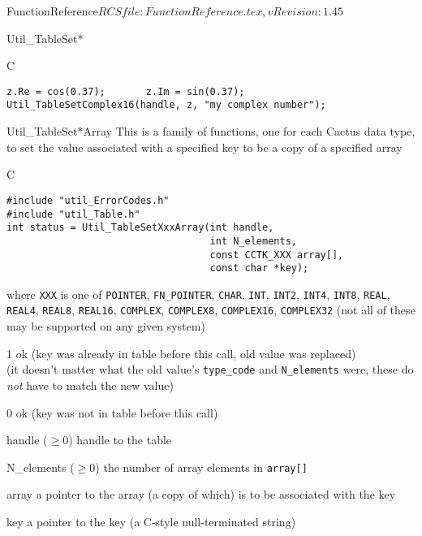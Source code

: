 \begin{cactuspart}{5}{FunctionReference}{$RCSfile: FunctionReference.tex,v $}{$Revision: 1.45 $}
\begin{FunctionDescription}{Util\_TableSet*}
\begin{Example}{C}
\begin{verbatim}
z.Re = cos(0.37);       z.Im = sin(0.37);
Util_TableSetComplex16(handle, z, "my complex number");
\end{verbatim}
\end{Example}
\end{FunctionDescription}


\begin{FunctionDescription}{Util\_TableSet*Array}
\label{Util-TableSet*Array}
This is a family of functions, one for each Cactus data type,
to set the value associated with a specified key to be a copy
of a specified array

\begin{Synopsis}{C}
\begin{verbatim}
#include "util_ErrorCodes.h"
#include "util_Table.h"
int status = Util_TableSetXxxArray(int handle,
                                   int N_elements,
                                   const CCTK_XXX array[],
                                   const char *key);
\end{verbatim}
where \verb|XXX| is one of
   \verb|POINTER|, \verb|FN_POINTER|,
   \verb|CHAR|,
   \verb|INT|, \verb|INT2|, \verb|INT4|, \verb|INT8|,
   \verb|REAL|, \verb|REAL4|, \verb|REAL8|, \verb|REAL16|,
   \verb|COMPLEX|, \verb|COMPLEX8|, \verb|COMPLEX16|, \verb|COMPLEX32|
(not all of these may be supported on any given system)
\end{Synopsis}

\begin{Result}{\rm 1}
ok (key was already in table before this call, old value was replaced)\\
   (it doesn't matter what the old value's \verb|type_code| and
    \verb|N_elements| were, \ie{} these do {\em not\/} have to match
    the new value)
\end{Result}
\begin{Result}{\rm 0}
ok (key was not in table before this call)
\end{Result}

\begin{Parameter}{handle ($\ge 0$)}
handle to the table
\end{Parameter}
\begin{Parameter}{N\_elements ($\ge 0$)}
the number of array elements in \verb|array[]|
\end{Parameter}
\begin{Parameter}{array}
a pointer to the array (a copy of which) is to be associated with the key
\end{Parameter}
\begin{Parameter}{key}
a pointer to the key (a C-style null-terminated string)
\end{Parameter}


\end{FunctionDescription}
\end{cactuspart}
